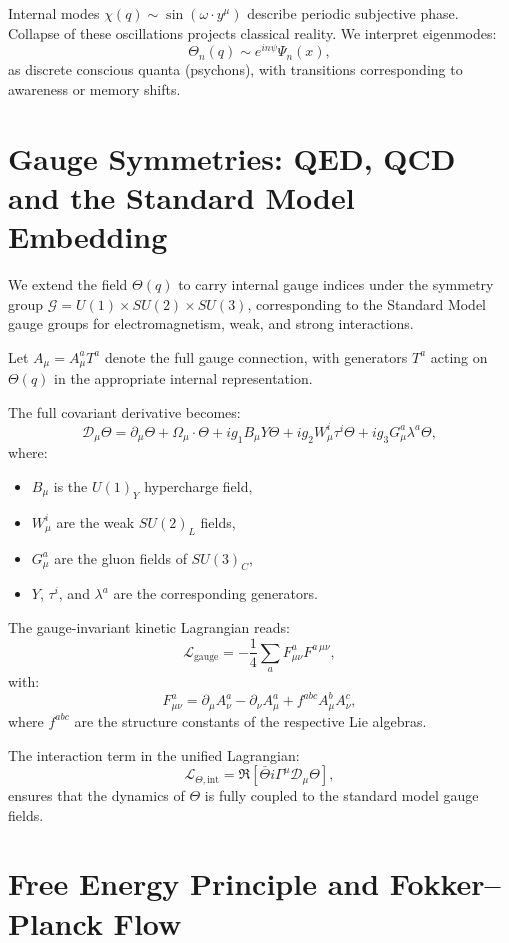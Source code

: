 \documentclass[12pt]{article}
\begin{document}
Internal modes \( \chi(q) \sim \sin(\omega \cdot y^\mu) \) describe periodic subjective phase. Collapse of these oscillations projects classical reality. We interpret eigenmodes:
\[
\Theta_n(q) \sim e^{i n \psi} \Psi_n(x),
\]
as discrete conscious quanta (psychons), with transitions corresponding to awareness or memory shifts.


\section{Gauge Symmetries: QED, QCD and the Standard Model Embedding}

We extend the field \(\Theta(q)\) to carry internal gauge indices under the symmetry group \( \mathcal{G} = U(1) \times SU(2) \times SU(3) \), corresponding to the Standard Model gauge groups for electromagnetism, weak, and strong interactions.

Let \(A_\mu = A_\mu^a T^a\) denote the full gauge connection, with generators \(T^a\) acting on \(\Theta(q)\) in the appropriate internal representation.

The full covariant derivative becomes:
\[
\mathcal{D}_\mu \Theta = \partial_\mu \Theta + \Omega_\mu \cdot \Theta + i g_1 B_\mu Y \Theta + i g_2 W_\mu^i \tau^i \Theta + i g_3 G_\mu^a \lambda^a \Theta,
\]
where:
\begin{itemize}
  \item \(B_\mu\) is the \(U(1)_Y\) hypercharge field,
  \item \(W_\mu^i\) are the weak \(SU(2)_L\) fields,
  \item \(G_\mu^a\) are the gluon fields of \(SU(3)_C\),
  \item \(Y\), \(\tau^i\), and \(\lambda^a\) are the corresponding generators.
\end{itemize}

The gauge-invariant kinetic Lagrangian reads:
\[
\mathcal{L}_{\text{gauge}} = -\frac{1}{4} \sum_a F^{a}_{\mu\nu} F^{a\,\mu\nu},
\]
with:
\[
F^a_{\mu\nu} = \partial_\mu A^a_\nu - \partial_\nu A^a_\mu + f^{abc} A^b_\mu A^c_\nu,
\]
where \(f^{abc}\) are the structure constants of the respective Lie algebras.

The interaction term in the unified Lagrangian:
\[
\mathcal{L}_{\Theta, \text{int}} = \Re \left[ \bar{\Theta} i \Gamma^\mu \mathcal{D}_\mu \Theta \right],
\]
ensures that the dynamics of \(\Theta\) is fully coupled to the standard model gauge fields.


\section{Free Energy Principle and Fokker–Planck Flow}
\end{document}
